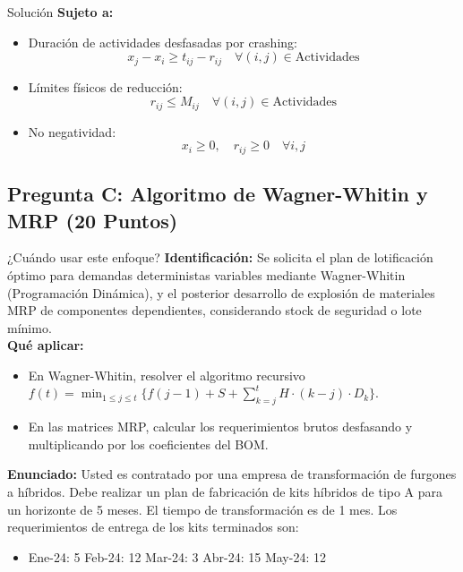 \documentclass[11pt, a4paper]{article}
\begin{document}
\begin{ejercicio}{Solución}
  \textbf{Sujeto a:}
  \begin{itemize}
    \item Duración de actividades desfasadas por crashing:
      \begin{equation}
        x_j - x_i \ge t_{ij} - r_{ij} \quad \forall (i,j) \in \text{Actividades}
      \end{equation}
    \item Límites físicos de reducción:
      \begin{equation}
        r_{ij} \le M_{ij} \quad \forall (i,j) \in \text{Actividades}
      \end{equation}
    \item No negatividad:
      \begin{equation}
        x_i \ge 0, \quad r_{ij} \ge 0 \quad \forall i, j
      \end{equation}
  \end{itemize}

\end{ejercicio}

\newpage

\subsection*{Pregunta C: Algoritmo de Wagner-Whitin y MRP (20 Puntos)}

  \begin{tipprueba}{¿Cuándo usar este enfoque?}
    \textbf{Identificación:} Se solicita el plan de lotificación óptimo para demandas deterministas variables mediante Wagner-Whitin (Programación Dinámica), y el posterior desarrollo de explosión de materiales MRP de componentes dependientes, considerando stock de seguridad o lote mínimo.\\
    \textbf{Qué aplicar:}
    \begin{itemize}
      \item En Wagner-Whitin, resolver el algoritmo recursivo $f(t) = \min_{1 \le j \le t} \{ f(j-1) + S + \sum_{k=j}^t H \cdot (k-j) \cdot D_k \}$.
      \item En las matrices MRP, calcular los requerimientos brutos desfasando y multiplicando por los coeficientes del BOM.
    \end{itemize}
  \end{tipprueba}

  \textbf{Enunciado:}
  Usted es contratado por una empresa de transformación de furgones a híbridos. Debe realizar un plan de fabricación de kits híbridos de tipo A para un horizonte de 5 meses. El tiempo de transformación es de 1 mes. Los requerimientos de entrega de los kits terminados son:
  \begin{itemize}
    \item Ene-24: 5 \quad Feb-24: 12 \quad Mar-24: 3 \quad Abr-24: 15 \quad May-24: 12
  \end{itemize}
\end{document}
